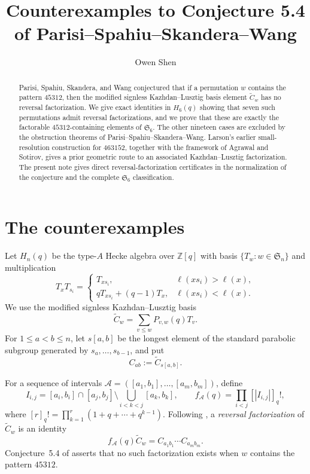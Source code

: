 \documentclass[10pt]{amsart}
\title[Counterexamples to Conjecture 5.4]
{Counterexamples to Conjecture 5.4 of
Parisi--Spahiu--Skandera--Wang}
\author{Owen Shen}
\date{}
\theoremstyle{remark}
\newcommand{\Sn}{\mathfrak S_n}
\newcommand{\Ssix}{\mathfrak S_6}
\newcommand{\Ct}{\widetilde C}
\newcommand{\Cab}[2]{C_{#1#2}}
\begin{document}
\begin{abstract}
Parisi, Spahiu, Skandera, and Wang conjectured that if a permutation
$w$ contains the pattern $45312$, then the modified signless
Kazhdan--Lusztig basis element $\Ct_w$ has no reversal factorization.
We give exact identities in $H_6(q)$ showing that seven such
permutations admit reversal factorizations, and we prove that these are
exactly the factorable $45312$-containing elements of $\Ssix$.
The other nineteen cases are excluded by the obstruction theorems of
Parisi--Spahiu--Skandera--Wang. Larson's earlier small-resolution
construction for $463152$, together with the framework of Agrawal and
Sotirov, gives a prior geometric route to an associated
Kazhdan--Lusztig factorization. The present note gives direct
reversal-factorization certificates in the normalization of the
conjecture and the complete $\Ssix$ classification.
\end{abstract}

\maketitle

\section{The counterexamples}

Let $H_n(q)$ be the type-$A$ Hecke algebra over $\mathbb Z[q]$ with
basis $\{T_w:w\in\Sn\}$ and multiplication
\[
T_xT_{s_i}=
\begin{cases}
T_{xs_i},&\ell(xs_i)>\ell(x),\\
qT_{xs_i}+(q-1)T_x,&\ell(xs_i)<\ell(x).
\end{cases}
\]
We use the modified signless Kazhdan--Lusztig basis
\cite{KazhdanLusztig}
\[
\Ct_w=\sum_{v\leq w}P_{v,w}(q)T_v.
\]
For $1\leq a<b\leq n$, let $s[a,b]$ be the longest element of the
standard parabolic subgroup generated by $s_a,\ldots,s_{b-1}$, and put
\[
\Cab{a}{b}:=\Ct_{s[a,b]}.
\]

For a sequence of intervals
$\mathcal A=([a_1,b_1],\ldots,[a_m,b_m])$, define
\[
I_{i,j}=[a_i,b_i]\cap[a_j,b_j]\setminus
\bigcup_{i<k<j}[a_k,b_k],
\qquad
f_{\mathcal A}(q)=\prod_{i<j}[|I_{i,j}|]_q!,
\]
where $[r]_q!=\prod_{k=1}^r(1+q+\cdots+q^{k-1})$.
Following \cite[Sec.~3]{ParisiEtAl}, a \emph{reversal factorization}
of $\Ct_w$ is an identity
\[
f_{\mathcal A}(q)\Ct_w
 =\Cab{a_1}{b_1}\cdots\Cab{a_m}{b_m}.
\]
Conjecture~5.4 of \cite{ParisiEtAl} asserts that no such factorization
exists when $w$ contains the pattern $45312$.
\end{document}
